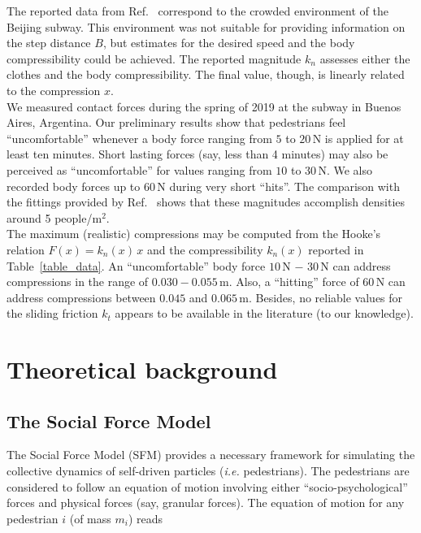 \documentclass[preprint,12pt]{elsarticle}
\begin{document}
The reported data from Ref.~\cite{song_2019} correspond to the crowded 
environment of the Beijing subway. This environment was not suitable for 
providing information on the step distance $B$, but estimates for the 
desired speed and the body compressibility could be achieved. The reported 
magnitude $k_n$ assesses either the clothes and the body compressibility. The 
final value, though, is linearly related to the compression $x$. \\

We measured 
contact forces during the spring of 2019 at the subway in Buenos Aires, 
Argentina. Our preliminary results show that pedestrians feel ``uncomfortable'' 
whenever a body force ranging from $5$ to $20\,$N is applied for at least ten 
minutes. Short lasting forces (say, less than 4 minutes) may also be perceived 
as ``uncomfortable'' for values ranging from $10$ to $30\,$N. We also recorded body 
forces up to $60\,$N during very short ``hits''. The comparison with the 
fittings provided by Ref.~\cite{song_2019} shows that these magnitudes 
accomplish densities around 5 people/m$^2$.     \\    

The maximum (realistic) compressions may be computed from the Hooke's relation 
$F(x)=k_n(x)\,x$ and the compressibility $k_n(x)$ reported in Table~\ref{table_data}. 
An ``uncomfortable'' body force  $10\,$N $-$ $30\,$N can address compressions in the 
range of $0.030-0.055\,$m. Also, a ``hitting'' force of $60\,$N can address 
compressions between $0.045$ and $0.065\,$m. 
Besides, no reliable values for the sliding friction $k_t$ appears to be 
available in the literature (to our knowledge).\\


\section{\label{background}Theoretical background}

\subsection{\label{sfm}The Social Force Model}

The Social Force Model (SFM) provides a necessary framework for simulating 
the collective dynamics of self-driven particles (\textit{i.e.} pedestrians). 
The pedestrians are considered to follow an equation of motion involving 
either ``socio-psychological'' forces and physical forces (say, granular 
forces). The equation of motion for any pedestrian $i$ (of mass $m_i$) reads
\end{document}
